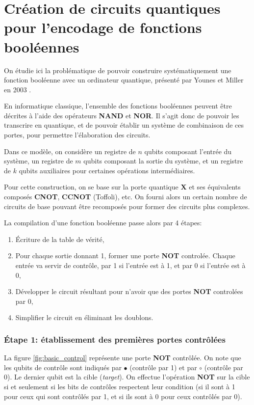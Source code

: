 \chapter{Création de circuits quantiques pour l’encodage de fonctions booléennes}
\label{appendix:ConstructionCircuit}

On étudie ici la problématique de pouvoir construire systématiquement une fonction booléenne avec un ordinateur quantique, présenté par Younes et Miller en 2003 \cite{Younes03}.

En informatique classique, l'ensemble des fonctions booléennes peuvent être décrites à l'aide des opérateurs \textbf{NAND} et \textbf{NOR}. Il s'agit donc de pouvoir les transcrire en quantique, et de pouvoir établir un système de combinaison de ces portes, pour permettre l'élaboration des circuits.

Dans ce modèle, on considère un registre de $n$ qubits composant l'entrée du système, un registre de $m$ qubits composant la sortie du système, et un registre de $k$ qubits auxiliaires pour certaines opérations intermédiaires.

Pour cette construction, on se base sur la porte quantique \textbf{X} et ses équivalents composés \textbf{CNOT}, \textbf{CCNOT} (Toffoli), etc. On fourni alors un certain nombre de circuits de base pouvant être recomposés pour former des circuits plus complexes.

La compilation d'une fonction booléenne passe alors par 4 étapes:

\begin{enumerate}
    \item \'Ecriture de la table de vérité,
    \item Pour chaque sortie donnant 1, former une porte \textbf{NOT} controlée. Chaque entrée va servir de contrôle, par 1 si l'entrée est à 1, et par 0 si l'entrée est à 0,
    \item Développer le circuit résultant pour n'avoir que des portes \textbf{NOT} controlées par 0,
    \item Simplifier le circuit en éliminant les doublons.
\end{enumerate}

\subsection*{\'Etape 1: établissement des premières portes contrôlées}
La figure \ref{fig:basic_control} représente une porte \textbf{NOT} contrôlée. On note que les qubits de contrôle sont indiqués par $\bullet$ (contrôle par 1) et par $\circ$ (contrôle par 0). Le dernier qubit est la cible (\textit{target}). On effectue l'opération \textbf{NOT} sur la cible si et seulement si les bits de contrôles respectent leur condition (si il sont à 1 pour ceux qui sont contrôlés par 1, et si ils sont à 0 pour ceux contrôlés par 0).

